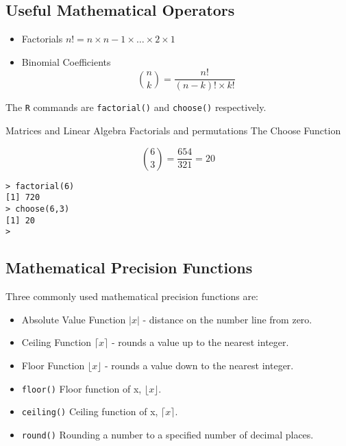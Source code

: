 \documentclass[a4paper,12pt]{article}
\begin{document}






\subsection{Useful Mathematical Operators}

\begin{itemize}
	\item Factorials
	$n! = n \times n-1 \times \ldots \times 2 \times 1 $
	\item Binomial Coefficients
	\[ { n \choose k }  = \frac{n!}{(n-k)! \times k!}\]
\end{itemize}
The \texttt{R} commands are \texttt{factorial()} and \texttt{choose()} respectively.

Matrices and Linear Algebra
Factorials and permutations
The Choose Function

\[ { 6 \choose 3} =\frac{654}{321}= 20\]


\begin{framed}
\begin{verbatim}
> factorial(6)
[1] 720
> choose(6,3)
[1] 20
> 
\end{verbatim}
\end{framed}

\subsection{Mathematical Precision Functions}
Three commonly used mathematical precision functions are:
\begin{itemize}
	\item Absolute Value Function $| x |$ - distance on the number line from zero.
	\item Ceiling Function $\lceil x \rceil$ - rounds a value up to the nearest integer.
	\item Floor Function  $\lfloor x \rfloor $ - rounds a value down to the nearest integer.
\end{itemize}
\begin{itemize}
	\item \texttt{floor()} Floor function of x, $\lfloor x \rfloor$.
	\item \texttt{ceiling()} Ceiling function of x, $\lceil x \rceil$.
	\item \texttt{round()} Rounding a number to a specified number of decimal places.
\end{itemize}
\end{document}
